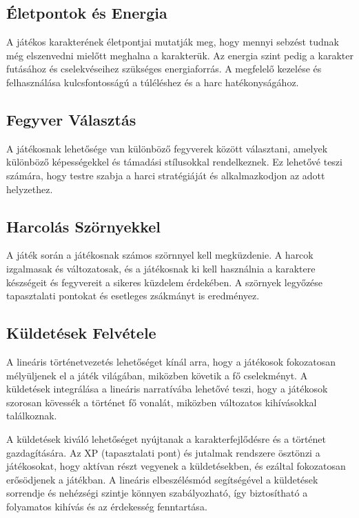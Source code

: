 \subsection{Életpontok és Energia}

\indent \indent A játékos karakterének életpontjai mutatják meg, hogy mennyi sebzést tudnak még elszenvedni mielőtt meghalna a karakterük. Az energia szint pedig a karakter futásához és cselekvéseihez szükséges energiaforrás. A megfelelő kezelése és felhasználása kulcsfontosságú a túléléshez és a harc hatékonyságához.

\subsection{Fegyver Választás}

\indent \indent A játékosnak lehetősége van különböző fegyverek között választani, amelyek különböző képességekkel és támadási stílusokkal rendelkeznek. Ez lehetővé teszi számára, hogy testre szabja a harci stratégiáját és alkalmazkodjon az adott helyzethez.

\subsection{Harcolás Szörnyekkel}

\indent \indent A játék során a játékosnak számos szörnnyel kell megküzdenie. A harcok izgalmasak és változatosak, és a játékosnak ki kell használnia a karaktere készségeit és fegyvereit a sikeres küzdelem érdekében. A szörnyek legyőzése tapasztalati pontokat és esetleges zsákmányt is eredményez.

\subsection{Küldetések Felvétele}

\indent \indent A lineáris történetvezetés lehetőséget kínál arra, hogy a játékosok fokozatosan mélyüljenek el a játék világában, miközben követik a fő cselekményt. A küldetések integrálása a lineáris narratívába lehetővé teszi, hogy a játékosok szorosan kövessék a történet fő vonalát, miközben változatos kihívásokkal találkoznak.

A küldetések kiváló lehetőséget nyújtanak a karakterfejlődésre és a történet gazdagítására. Az XP (tapasztalati pont) és jutalmak rendszere ösztönzi a játékosokat, hogy aktívan részt vegyenek a küldetésekben, és ezáltal fokozatosan erősödjenek a játékban. A lineáris elbeszélésmód segítségével a küldetések sorrendje és nehézségi szintje könnyen szabályozható, így biztosítható a folyamatos kihívás és az érdekesség fenntartása.

